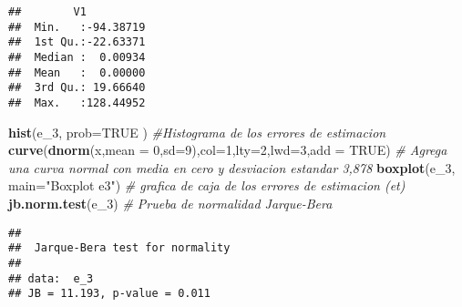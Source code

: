 \documentclass[
]{article}
\newenvironment{Shaded}{\begin{snugshade}}{\end{snugshade}}
\newcommand{\CommentTok}[1]{\textcolor[rgb]{0.56,0.35,0.01}{\textit{#1}}}
\newcommand{\DataTypeTok}[1]{\textcolor[rgb]{0.13,0.29,0.53}{#1}}
\newcommand{\DecValTok}[1]{\textcolor[rgb]{0.00,0.00,0.81}{#1}}
\newcommand{\KeywordTok}[1]{\textcolor[rgb]{0.13,0.29,0.53}{\textbf{#1}}}
\newcommand{\NormalTok}[1]{#1}
\newcommand{\OtherTok}[1]{\textcolor[rgb]{0.56,0.35,0.01}{#1}}
\newcommand{\StringTok}[1]{\textcolor[rgb]{0.31,0.60,0.02}{#1}}
\begin{document}
\begin{verbatim}
##        V1           
##  Min.   :-94.38719  
##  1st Qu.:-22.63371  
##  Median :  0.00934  
##  Mean   :  0.00000  
##  3rd Qu.: 19.66640  
##  Max.   :128.44952
\end{verbatim}

\begin{Shaded}
\begin{Highlighting}[]
\KeywordTok{hist}\NormalTok{(e_}\DecValTok{3}\NormalTok{, }\DataTypeTok{prob=}\OtherTok{TRUE}\NormalTok{ )   }\CommentTok{#Histograma de los errores de estimacion }
\KeywordTok{curve}\NormalTok{(}\KeywordTok{dnorm}\NormalTok{(x,}\DataTypeTok{mean =} \DecValTok{0}\NormalTok{,}\DataTypeTok{sd=}\DecValTok{9}\NormalTok{),}\DataTypeTok{col=}\DecValTok{1}\NormalTok{,}\DataTypeTok{lty=}\DecValTok{2}\NormalTok{,}\DataTypeTok{lwd=}\DecValTok{3}\NormalTok{,}\DataTypeTok{add =} \OtherTok{TRUE}\NormalTok{) }\CommentTok{# Agrega una curva normal con media en cero y desviacion estandar 3,878 }
\KeywordTok{boxplot}\NormalTok{(e_}\DecValTok{3}\NormalTok{, }\DataTypeTok{main=}\StringTok{"Boxplot e3"}\NormalTok{) }\CommentTok{# grafica de caja de los errores de estimacion (et)}
\KeywordTok{jb.norm.test}\NormalTok{(e_}\DecValTok{3}\NormalTok{) }\CommentTok{# Prueba de normalidad Jarque-Bera }
\end{Highlighting}
\end{Shaded}

\begin{verbatim}
## 
##  Jarque-Bera test for normality
## 
## data:  e_3
## JB = 11.193, p-value = 0.011
\end{verbatim}
\end{document}
